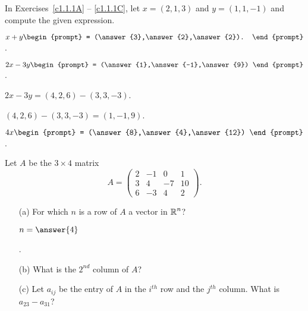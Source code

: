 \documentclass{ximera}
\begin{document}
\noindent In Exercises~\ref{c1.1.1A} -- \ref{c1.1.1C}, let $x=(2,1,3)$ and 
$y=(1,1,-1)$ and compute the given expression.
\begin{exercise}  \label{c1.1.1A}
  $x+y\begin{prompt}
    = (\answer{3},\answer{2},\answer{2}).
  \end{prompt}$.
\end{exercise}
\begin{exercise}  \label{c1.1.1B}
  $2x-3y\begin{prompt}
    = (\answer{1},\answer{-1},\answer{9})
  \end{prompt}$.
  \begin{hint}
    $2x - 3y = (4,2,6) - (3,3,-3)$.
  \end{hint}
  \begin{hint}
    $(4,2,6) - (3,3,-3) = (1,-1,9)$.
  \end{hint}  
\end{exercise}
\begin{exercise}  \label{c1.1.1C}
  $4x\begin{prompt}
    = (\answer{8},\answer{4},\answer{12})
    \end{prompt}$.
\end{exercise}

\begin{exercise} \label{c1.1.2}
Let $A$ be the $3\times 4$ matrix
\[
A=\left(\begin{array}{rrrr} 2 & -1 & 0 & 1 \\ 3 & 4 & -7 & 10\\
        6 & -3 & 4 & 2 \end{array}\right).
\]
\begin{enumerate}
\item[(a)]  For which $n$ is a row of $A$ a vector in $\mbox{$\Bbb{R}$}^n$? \begin{prompt}$n = \answer{4}$\end{prompt}.
\item[(b)]  What is the $2^{nd}$ column of $A$?
\item[(c)] Let $a_{ij}$ be the entry of $A$ in the $i^{th}$ row
and the $j^{th}$ column.  What is $a_{23}-a_{31}$?
\end{enumerate}
\end{exercise}
\end{document}
